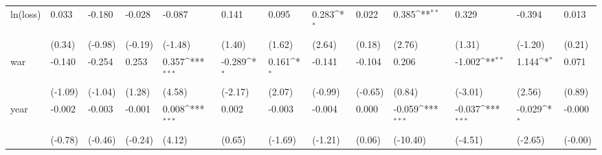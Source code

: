 \def\sym#1{\ifmmode^{#1}\else\(^{#1}\)\fi}
\begin{tabular}{p{1.5cm} p{1.7cm} p{1.7cm} p{1.7cm} p{1.7cm} p{1.7cm} p{1.7cm} p{1.7cm} p{1.7cm} p{1.7cm} p{1.7cm} p{1.7cm} p{1.7cm}}
\hline
ln(loss)        &    0.033         &   -0.180         &   -0.028         &   -0.087         &    0.141         &    0.095         &    0.283\sym{*}  &    0.022         &    0.385\sym{**} &    0.329         &   -0.394         &    0.013         \\
                &   (0.34)         &  (-0.98)         &  (-0.19)         &  (-1.48)         &   (1.40)         &   (1.62)         &   (2.64)         &   (0.18)         &   (2.76)         &   (1.31)         &  (-1.20)         &   (0.21)         \\
war             &   -0.140         &   -0.254         &    0.253         &    0.357\sym{***}&   -0.289\sym{*}  &    0.161\sym{*}  &   -0.141         &   -0.104         &    0.206         &   -1.002\sym{**} &    1.144\sym{*}  &    0.071         \\
                &  (-1.09)         &  (-1.04)         &   (1.28)         &   (4.58)         &  (-2.17)         &   (2.07)         &  (-0.99)         &  (-0.65)         &   (0.84)         &  (-3.01)         &   (2.56)         &   (0.89)         \\
year            &   -0.002         &   -0.003         &   -0.001         &    0.008\sym{***}&    0.002         &   -0.003         &   -0.004         &    0.000         &   -0.059\sym{***}&   -0.037\sym{***}&   -0.029\sym{*}  &   -0.000         \\
                &  (-0.78)         &  (-0.46)         &  (-0.24)         &   (4.12)         &   (0.65)         &  (-1.69)         &  (-1.21)         &   (0.06)         & (-10.40)         &  (-4.51)         &  (-2.65)         &  (-0.00)         \\
\end{tabular}
\def\sym#1{\ifmmode^{#1}\else\(^{#1}\)\fi}
